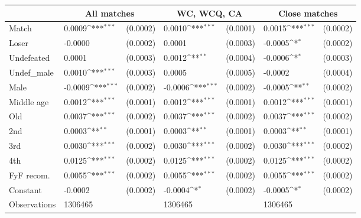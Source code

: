 {
\def\sym#1{\ifmmode^{#1}\else\(^{#1}\)\fi}
\begin{tabular*}{1\hsize}{@{\hskip\tabcolsep\extracolsep\fill}l*{3}{lc}}
\toprule
                &\multicolumn{2}{c}{All matches}&\multicolumn{2}{c}{WC, WCQ, CA}&\multicolumn{2}{c}{Close matches}\\
\midrule
Match           &   0.0009\sym{***}& (0.0002)&   0.0010\sym{***}& (0.0001)&   0.0015\sym{***}& (0.0002)\\
Loser           &  -0.0000         & (0.0002)&   0.0001         & (0.0003)&  -0.0005\sym{*}  & (0.0002)\\
Undefeated      &   0.0001         & (0.0003)&   0.0012\sym{**} & (0.0004)&  -0.0006\sym{*}  & (0.0003)\\
Undef\_male      &   0.0010\sym{***}& (0.0003)&   0.0005         & (0.0005)&  -0.0002         & (0.0004)\\
Male            &  -0.0009\sym{***}& (0.0002)&  -0.0006\sym{***}& (0.0002)&  -0.0005\sym{**} & (0.0002)\\
Middle age      &   0.0012\sym{***}& (0.0001)&   0.0012\sym{***}& (0.0001)&   0.0012\sym{***}& (0.0001)\\
Old             &   0.0037\sym{***}& (0.0002)&   0.0037\sym{***}& (0.0002)&   0.0037\sym{***}& (0.0002)\\
2nd             &   0.0003\sym{**} & (0.0001)&   0.0003\sym{**} & (0.0001)&   0.0003\sym{**} & (0.0001)\\
3rd             &   0.0030\sym{***}& (0.0002)&   0.0030\sym{***}& (0.0002)&   0.0030\sym{***}& (0.0002)\\
4th             &   0.0125\sym{***}& (0.0002)&   0.0125\sym{***}& (0.0002)&   0.0125\sym{***}& (0.0002)\\
FyF recom.      &   0.0055\sym{***}& (0.0002)&   0.0055\sym{***}& (0.0002)&   0.0055\sym{***}& (0.0002)\\
Constant        &  -0.0002         & (0.0002)&  -0.0004\sym{*}  & (0.0002)&  -0.0005\sym{*}  & (0.0002)\\
\midrule
Observations    &  1306465         &         &  1306465         &         &  1306465         &         \\
\bottomrule
\end{tabular*}
}
